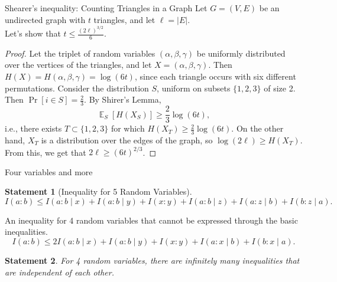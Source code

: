 \documentclass[aspectratio=169]{beamer}
\newtheorem{statement}{Statement}
\DeclareMathOperator*{\E}{\mathbb{E}}
\begin{document}
    \begin{frame}{Shearer's inequality: Counting Triangles in a Graph}
		    Let \(G = (V, E)\) be an undirected graph with \(t\) triangles, and let \(\ell = |E|\).\\
		    Let's show that \(t \le \frac{(2\ell)^{3/2}}{6}\).
		    \pause \begin{proof}
		        Let the triplet of random variables \((\alpha, \beta, \gamma)\) be uniformly distributed over the vertices of the triangles, and let \(X = (\alpha, \beta, \gamma)\). Then \(H(X) = H(\alpha, \beta, \gamma) = \log(6t)\), since each triangle occurs with six different permutations. Consider the distribution \(S\), uniform on subsets \(\{1, 2, 3\}\) of size 2. Then \(\Pr[i \in S] = \frac{2}{3}\). By Shirer's Lemma,
		    \[
		        \E_S[H(X_S)] \ge \frac{2}{3} \log(6t),
		    \]
		    i.e., there exists \(T \subset \{1, 2, 3\}\) for which \(H(X_T) \ge \frac{2}{3} \log(6t)\).
		    On the other hand, \(X_T\) is a distribution over the edges of the graph, so \(\log(2\ell) \ge H(X_T)\). From this, we get that \(2\ell \ge (6t)^{2/3}\).
		    \end{proof}

    \end{frame}

    \begin{frame}{Four variables and more}
		\begin{statement}[Inequality for 5 Random Variables]
		    $
		        I(a : b) \le I(a : b \mid x) + I(a : b \mid y) + I(x : y)
		        + I(a : b \mid z) + I(a : z \mid b) + I(b : z \mid a).
		    $
		\end{statement}
		\begin{corollary}
		    An inequality for 4 random variables that cannot be expressed through the basic inequalities.
		    \[
		        I(a : b) \le 2I(a : b \mid x) + I(a : b \mid y) + I(x : y)
		        + I(a : x \mid b) + I(b : x \mid a).
		    \]
		\end{corollary}
		\begin{statement}
		    For 4 random variables, there are infinitely many inequalities that are independent of each other.
		\end{statement}

    \end{frame}
\end{document}
